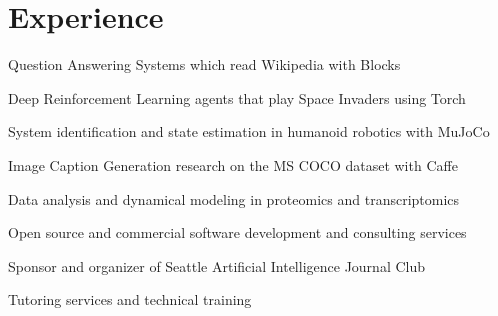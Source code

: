 \documentclass[letterpaper]{deedy-resume} %
\begin{document}
\begin{minipage}[t]{0.66\textwidth} %


\section{Experience}

\vspace{\topsep}
\begin{tightitemize}
\item  Question Answering Systems which read Wikipedia with Blocks
\item  Deep Reinforcement Learning agents that play Space Invaders using Torch
\item  System identification and state estimation in humanoid robotics with MuJoCo
\item  Image Caption Generation research on the MS COCO dataset with Caffe
\item  Data analysis and dynamical modeling in proteomics and transcriptomics
\item  Open source and commercial software development and consulting services
\item  Sponsor and organizer of Seattle Artificial Intelligence Journal Club
\item  Tutoring services and technical training
\end{tightitemize}


\end{minipage}
\end{document}
